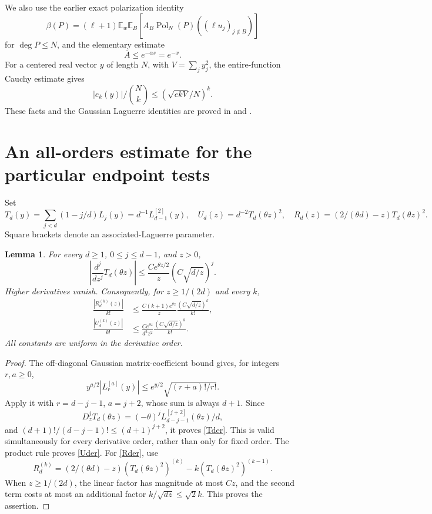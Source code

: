 \documentclass[11pt]{article}
\newtheorem{lemma}{Lemma}
\newcommand{\E}{\mathbb E}
\newcommand{\Pol}{\operatorname{Pol}}
\begin{document}
We also use the earlier exact polarization identity
\begin{equation}\label{exact}
 \beta(P)=(\ell+1)\E_w\E_B
       [A_B\Pol_N(P)((\ell u_j)_{j\notin B})]
\end{equation}
for $\deg P\le N$, and the elementary estimate
\begin{equation}\label{abar}
 \bar A\le e^{-\alpha s}=e^{-x}.
\end{equation}
For a centered real vector $y$ of length $N$, with
$V=\sum_j y_j^2$, the entire-function Cauchy estimate gives
\begin{equation}\label{centered}
 |e_k(y)|/\binom Nk\le(\sqrt{ekV}/N)^k.
\end{equation}
These facts and the Gaussian Laguerre identities are proved in
 and
.

\section*{An all-orders estimate for the particular endpoint tests}
Set
\[
 T_d(y)=\sum_{j<d}(1-j/d)L_j(y)=d^{-1}L_{d-1}^{[2]}(y),
\quad U_d(z)=d^{-2}T_d(\theta z)^2,
\quad R_d(z)=(2/(\theta d)-z)T_d(\theta z)^2.
\]
Square brackets denote an associated-Laguerre parameter.

\begin{lemma}\label{allorders}
For every $d\ge1$, $0\le j\le d-1$, and $z>0$,
\begin{equation}\label{Tder}
 \left|\frac{d^j}{dz^j}T_d(\theta z)\right|
 \le\frac{C e^{\theta z/2}}z
                       \left(C\sqrt{d/z}\right)^j.
\end{equation}
Higher derivatives vanish. Consequently, for $z\ge1/(2d)$ and every $k$,
\begin{align}
 \frac{|R_d^{(k)}(z)|}{k!}
 &\le\frac{C(k+1)e^{\theta z}}z
                      \frac{(C\sqrt{d/z})^k}{k!},\label{Rder}\\
 \frac{|U_d^{(k)}(z)|}{k!}
 &\le\frac{C e^{\theta z}}{d^2z^2}
                      \frac{(C\sqrt{d/z})^k}{k!}.\label{Uder}
\end{align}
All constants are uniform in the derivative order.
\end{lemma}
\begin{proof}
The off-diagonal Gaussian matrix-coefficient bound gives, for integers
$r,a\ge0$,
\[
 y^{a/2}|L_r^{[a]}(y)|
       \le e^{y/2}\sqrt{(r+a)!/r!}.
\]
Apply it with $r=d-j-1$, $a=j+2$, whose sum is always $d+1$.
Since
\[
 D_z^j T_d(\theta z)=(-\theta)^jL_{d-j-1}^{[j+2]}(\theta z)/d,
\]
and $(d+1)!/(d-j-1)!\le(d+1)^{j+2}$, it proves \eqref{Tder}.
This is valid simultaneously for every derivative order, rather than
only for fixed order. The product rule proves \eqref{Uder}.
For \eqref{Rder}, use
\[
 R_d^{(k)}=(2/(\theta d)-z)(T_d(\theta z)^2)^{(k)}
                        -k(T_d(\theta z)^2)^{(k-1)}.
\]
When $z\ge1/(2d)$, the linear factor has magnitude at most $Cz$,
and the second term costs at most an additional factor
$k/\sqrt{dz}\le\sqrt2 k$. This proves the assertion.
\end{proof}
\end{document}
